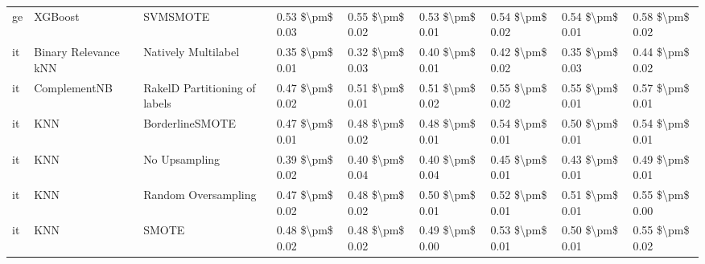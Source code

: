 \begin{tabular}{lllllllll}
      ge &                         XGBoost &                      SVMSMOTE & 0.53 \$\textbackslash pm\$ 0.03 &           0.55 \$\textbackslash pm\$ 0.02 &       0.53 \$\textbackslash pm\$ 0.01 &        0.54 \$\textbackslash pm\$ 0.02 &                         0.54 \$\textbackslash pm\$ 0.01 &     0.58 \$\textbackslash pm\$ 0.02 \\
      it &            Binary Relevance kNN &           Natively Multilabel & 0.35 \$\textbackslash pm\$ 0.01 &           0.32 \$\textbackslash pm\$ 0.03 &       0.40 \$\textbackslash pm\$ 0.01 &        0.42 \$\textbackslash pm\$ 0.02 &                         0.35 \$\textbackslash pm\$ 0.03 &     0.44 \$\textbackslash pm\$ 0.02 \\
      it &                    ComplementNB & RakelD Partitioning of labels & 0.47 \$\textbackslash pm\$ 0.02 &           0.51 \$\textbackslash pm\$ 0.01 &       0.51 \$\textbackslash pm\$ 0.02 &        0.55 \$\textbackslash pm\$ 0.02 &                         0.55 \$\textbackslash pm\$ 0.01 &     0.57 \$\textbackslash pm\$ 0.01 \\
      it &                             KNN &               BorderlineSMOTE & 0.47 \$\textbackslash pm\$ 0.01 &           0.48 \$\textbackslash pm\$ 0.02 &       0.48 \$\textbackslash pm\$ 0.01 &        0.54 \$\textbackslash pm\$ 0.01 &                         0.50 \$\textbackslash pm\$ 0.01 &     0.54 \$\textbackslash pm\$ 0.01 \\
      it &                             KNN &                 No Upsampling & 0.39 \$\textbackslash pm\$ 0.02 &           0.40 \$\textbackslash pm\$ 0.04 &       0.40 \$\textbackslash pm\$ 0.04 &        0.45 \$\textbackslash pm\$ 0.01 &                         0.43 \$\textbackslash pm\$ 0.01 &     0.49 \$\textbackslash pm\$ 0.01 \\
      it &                             KNN &           Random Oversampling & 0.47 \$\textbackslash pm\$ 0.02 &           0.48 \$\textbackslash pm\$ 0.02 &       0.50 \$\textbackslash pm\$ 0.01 &        0.52 \$\textbackslash pm\$ 0.01 &                         0.51 \$\textbackslash pm\$ 0.01 &     0.55 \$\textbackslash pm\$ 0.00 \\
      it &                             KNN &                         SMOTE & 0.48 \$\textbackslash pm\$ 0.02 &           0.48 \$\textbackslash pm\$ 0.02 &       0.49 \$\textbackslash pm\$ 0.00 &        0.53 \$\textbackslash pm\$ 0.01 &                         0.50 \$\textbackslash pm\$ 0.01 &     0.55 \$\textbackslash pm\$ 0.02 \\

\end{tabular}
